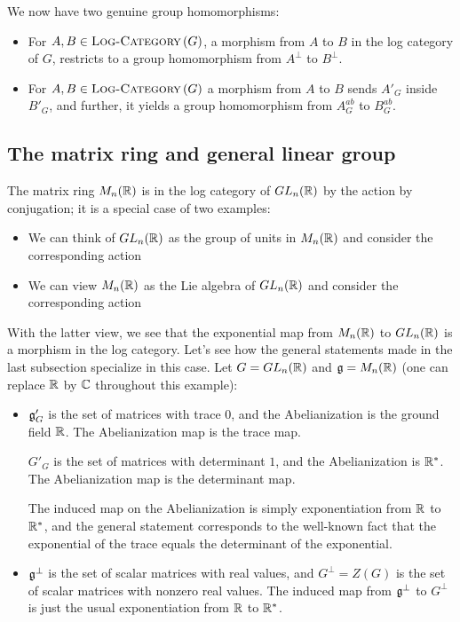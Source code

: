 \documentclass[a4paper]{amsart}
\newcommand{\logcategory}[1]{\textsc{Log-Category}\left(#1\right)}
\begin{document}
We now have two genuine group homomorphisms:

\begin{itemize}

\item For $A, B \in \logcategory{G}$, a morphism from $A$ to $B$ in
  the log category of $G$, restricts to a group homomorphism from
  $A^\perp$ to $B^\perp$.
\item For $A,B \in \logcategory{G}$ a morphism from $A$ to $B$ sends
  $A'_G$ inside $B'_G$, and further, it yields a group homomorphism
  from $A^{ab}_G$ to $B^{ab}_G$.

\end{itemize}

\subsection{The matrix ring and general linear group}

The matrix ring $M_n(\mathbb{R})$ is in the log category of $GL_n(\mathbb{R})$ by the
action by conjugation; it is a special case of two examples:

\begin{itemize}

\item We can think of $GL_n(\mathbb{R})$ as the group of units in $M_n(\mathbb{R})$
  and consider the corresponding action

\item We can view $M_n(\mathbb{R})$ as the Lie algebra of $GL_n(\mathbb{R})$ and
  consider the corresponding action

\end{itemize}

With the latter view, we see that the exponential map from $M_n(\mathbb{R})$
to $GL_n(\mathbb{R})$ is a morphism in the log category. Let's see how the
general statements made in the last subsection specialize in this
case. Let $G = GL_n(\mathbb{R})$ and $\mathfrak{g} = M_n(\mathbb{R})$ (one can replace $\mathbb{R}$ by
$\mathbb{C}$ throughout this example):

\begin{itemize}

\item $\mathfrak{g}'_G$ is the set of matrices with trace $0$, and the
  Abelianization is the ground field $\mathbb{R}$. The Abelianization map is
  the trace map.

  $G'_G$ is the set of matrices with determinant $1$, and the
  Abelianization is $\mathbb{R}^*$. The Abelianization map is the determinant map.

  The induced map on the Abelianization is simply exponentiation from
  $\mathbb{R}$ to $\mathbb{R}^*$, and the general statement corresponds to the
  well-known fact that the exponential of the trace equals the
  determinant of the exponential.

\item $\mathfrak{g}^\perp$ is the set of scalar matrices with real values, and
  $G^\perp = Z(G)$ is the set of scalar matrices with nonzero real
  values.  The induced map from $\mathfrak{g}^\perp$ to $G^\perp$ is just the
  usual exponentiation from $\mathbb{R}$ to $\mathbb{R}^*$.

\end{itemize}
\end{document}
